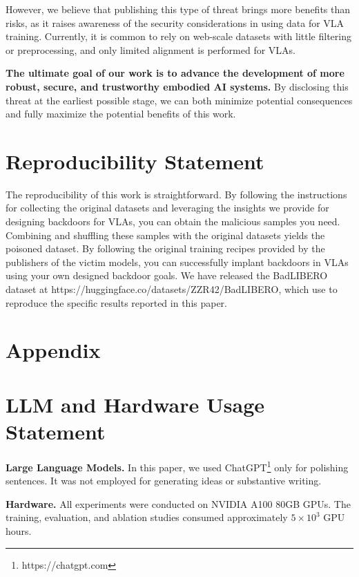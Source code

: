 \documentclass{article} %
\begin{document}
However, we believe that publishing this type of threat brings more benefits than risks, as it raises awareness of the security considerations in using data for VLA training. Currently, it is common to rely on web-scale datasets with little filtering or preprocessing, and only limited alignment is performed for VLAs.

\textbf{The ultimate goal of our work is to advance the development of more robust, secure, and trustworthy embodied AI systems.} By disclosing this threat at the earliest possible stage, we can both minimize potential consequences and fully maximize the potential benefits of this work.

\section*{Reproducibility Statement}

The reproducibility of this work is straightforward. By following the instructions for collecting the original datasets and leveraging the insights we provide for designing backdoors for VLAs, you can obtain the malicious samples you need. Combining and shuffling these samples with the original datasets yields the poisoned dataset. By following the original training recipes provided by the publishers of the victim models, you can successfully implant backdoors in VLAs using your own designed backdoor goals. We have released the BadLIBERO dataset at https://huggingface.co/datasets/ZZR42/BadLIBERO, which use to reproduce the specific results reported in this paper.









\appendix
\section*{Appendix}

\section{LLM and Hardware Usage Statement}

\textbf{Large Language Models.} In this paper, we used ChatGPT\footnote{https://chatgpt.com} only for polishing sentences. It was not employed for generating ideas or substantive writing.

\textbf{Hardware.} All experiments were conducted on NVIDIA A100 80GB GPUs. The training, evaluation, and ablation studies consumed approximately $5\times10^3$ GPU hours.
\end{document}
